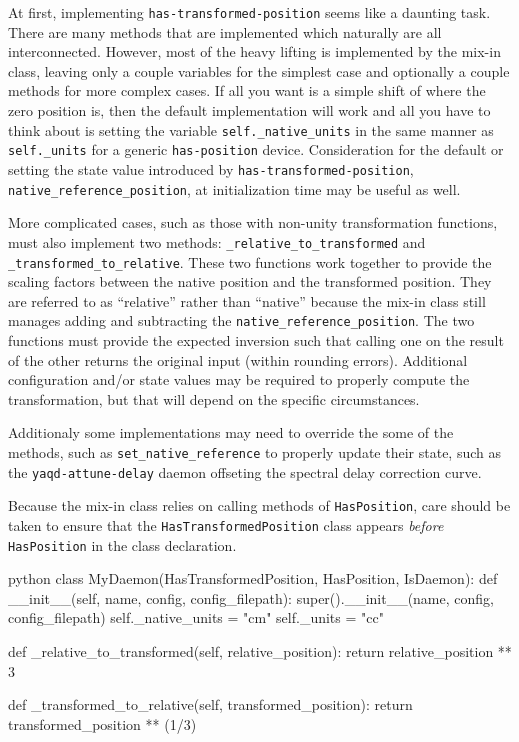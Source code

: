 At first, implementing \texttt{has-transformed-position} seems like a daunting task.
There are many methods that are implemented which naturally are all interconnected.
However, most of the heavy lifting is implemented by the mix-in class, leaving only a couple variables for the simplest case and optionally a couple methods for more complex cases.
If all you want is a simple shift of where the zero position is, then the default implementation will work and all you have to think about is setting the variable \texttt{self.\_native\_units} in the same manner as \texttt{self.\_units} for a generic \texttt{has-position} device.
Consideration for the default or setting the state value introduced by \texttt{has-transformed-position}, \texttt{native\_reference\_position}, at initialization time may be useful as well.

More complicated cases, such as those with non-unity transformation functions, must also implement two methods: \texttt{\_relative\_to\_transformed} and \texttt{\_transformed\_to\_relative}.
These two functions work together to provide the scaling factors between the native position and the transformed position.
They are referred to as ``relative'' rather than ``native'' because the mix-in class still manages adding and subtracting the \texttt{native\_reference\_position}.
The two functions must provide the expected inversion such that calling one on the result of the other returns the original input (within rounding errors).
Additional configuration and/or state values may be required to properly compute the transformation, but that will depend on the specific circumstances.

Additionaly some implementations may need to override the some of the methods, such as \texttt{set\_native\_reference} to properly update their state, such as the \texttt{yaqd-attune-delay} daemon offseting the spectral delay correction curve.

Because the mix-in class relies on calling methods of \texttt{HasPosition}, care should be taken to ensure that the \texttt{HasTransformedPosition} class appears \textit{before} \texttt{HasPosition} in the class declaration.

\begin{codefragment}{python}
class MyDaemon(HasTransformedPosition, HasPosition, IsDaemon):
    def __init__(self, name, config, config_filepath):
        super().__init__(name, config, config_filepath)
        self._native_units = "cm"
        self._units = "cc"

    def _relative_to_transformed(self, relative_position):
        return relative_position ** 3

    def _transformed_to_relative(self, transformed_position):
        return transformed_position ** (1/3)
\end{codefragment}


